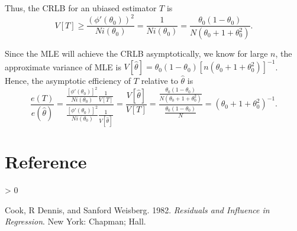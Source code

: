 \documentclass[
]{article}
\newlength{\cslhangindent}
\newenvironment{CSLReferences}[2] %
 {%
  \setlength{\parindent}{0pt}
  \ifodd #1 \everypar{\setlength{\hangindent}{\cslhangindent}}\ignorespaces\fi
  \ifnum #2 > 0
  \setlength{\parskip}{#2\baselineskip}
  \fi
 }%
 {}
\begin{document}
Thus, the CRLB for an ubiased estimator \(T\) is
\[V[T] \geq \frac{(\phi'(\theta_0))^2}{Ni(\theta_0)} = \frac{1}{Ni(\theta_0)}=\frac{\theta_0(1-\theta_0)}{N(\theta_0+1+\theta_0^2)}.\]

Since the MLE will achieve the CRLB asymptotically, we know for large
\(n\), the approximate variance of MLE is
\(V[\hat{\theta}] = \theta_0(1-\theta_0)[n(\theta_0+1+\theta_0^2)]^{-1}\).
Hence, the asymptotic efficiency of \(T\) relative to \(\hat{\theta}\)
is
\[\frac{e(T)}{e(\hat{\theta})} = \frac{\frac{[\phi'(\theta_0)]^2}{Ni(\theta_0)}\frac{1}{V[T]}}{\frac{[\phi'(\theta_0)]^2}{Ni(\theta_0)}\frac{1}{V[\hat{\theta}]}} = \frac{V[\hat{\theta}]}{V[T]} = \frac{\frac{\theta_0(1-\theta_0)}{N(\theta_0+1+\theta_0^2)}}{\frac{\theta_0(1-\theta_0)}{N}}=(\theta_0+1+\theta_0^2)^{-1}.\]

\clearpage

\hypertarget{reference}{%
\section*{Reference}\label{reference}}

\hypertarget{refs}{}
\begin{CSLReferences}{1}{0}
\leavevmode\hypertarget{ref-cook1982residuals}{}%
Cook, R Dennis, and Sanford Weisberg. 1982. \emph{Residuals and
Influence in Regression}. New York: Chapman; Hall.

\end{CSLReferences}
\end{document}
